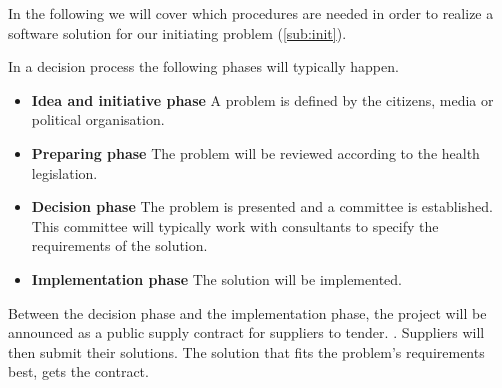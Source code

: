 In the following we will cover which procedures are needed in order to realize a software solution for our initiating problem (\cref{sub:init}).

In a decision process the following phases will typically happen. \cite{Sjaelland}


\begin{itemize}
  \setlength{\itemsep}{1pt}
  \setlength{\parskip}{0pt}
  \setlength{\parsep}{0pt}
	\item \textbf{Idea and initiative phase} A problem is defined by the citizens, media or political organisation.
	\item \textbf{Preparing phase} The problem will be reviewed according to the health legislation.
	\item \textbf{Decision phase} The problem is presented and a committee is established. This committee will typically work with consultants to specify the requirements of the solution.
	\item \textbf{Implementation phase} The solution will be implemented. 
\end{itemize}


Between the decision phase and the implementation phase, the project will be announced as a public supply contract for suppliers to tender. \cite{Union2004}. Suppliers will then submit their solutions. The solution that fits the problem's requirements best, gets the contract. 

